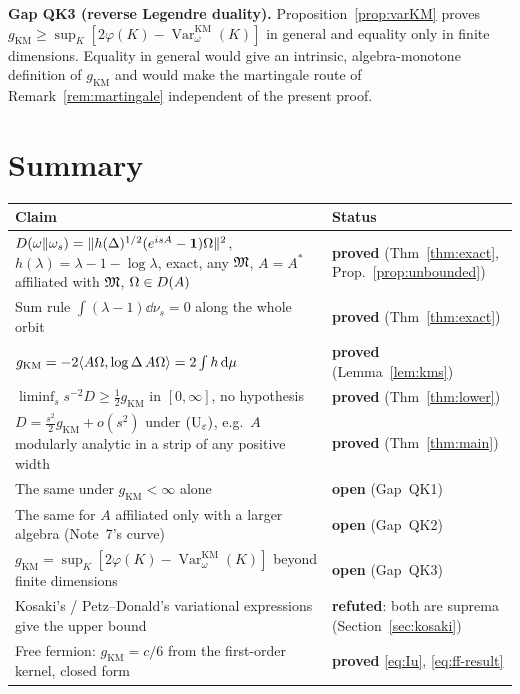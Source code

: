 \documentclass[11pt]{article}
\newcommand{\ip}[2]{\langle#1,#2\rangle}\newcommand{\norm}[1]{\lVert#1\rVert}
\newcommand{\gKM}{g_{\mathrm{KM}}}\newcommand{\gB}{g_{\mathrm B}}
\newcommand{\one}{\mathbf 1}\newcommand{\dist}{\operatorname{dist}}
\begin{document}
\begin{verdictgap}
\textbf{Gap QK3 (reverse Legendre duality).}  Proposition~\ref{prop:varKM} proves
$\gKM\ge\sup_K[2\varphi(K)-\operatorname{Var}^{\mathrm{KM}}_\omega(K)]$ in general and equality only in
finite dimensions.  Equality in general would give an intrinsic, algebra-monotone definition of $\gKM$
and would make the martingale route of Remark~\ref{rem:martingale} independent of the present proof.
\end{verdictgap}

\section{Summary}\label{sec:summary}

\begin{center}\small
\begin{tabular}{@{}p{}p{}@{}}\toprule
\textbf{Claim} & \textbf{Status}\\\midrule
$D(\omega\Vert\omega_s)=\norm{h(\Delta)^{1/2}(e^{isA}-\one)\Om}^2$, $h(\lambda)=\lambda-1-\log\lambda$,
 exact, any $\mathfrak M$, $A=A^*$ affiliated with $\mathfrak M$, $\Omega\in D(A)$
 & \textbf{proved} (Thm~\ref{thm:exact}, Prop.~\ref{prop:unbounded})\\
Sum rule $\int(\lambda-1)\dd\nu_s=0$ along the whole orbit & \textbf{proved} (Thm~\ref{thm:exact})\\
$\gKM=-2\ip{A\Om}{\log\Delta\,A\Om}=2\int h\dd\mu$ & \textbf{proved} (Lemma~\ref{lem:kms})\\
$\liminf_ss^{-2}D\ge\frac12\gKM$ in $[0,\infty]$, no hypothesis & \textbf{proved} (Thm~\ref{thm:lower})\\
$D=\frac{s^2}2\gKM+o(s^2)$ under $(\mathrm U_\varepsilon)$, e.g.\ $A$ modularly analytic in a strip of any
 positive width & \textbf{proved} (Thm~\ref{thm:main})\\
The same under $\gKM<\infty$ alone & \textbf{open} (Gap~QK1)\\
The same for $A$ affiliated only with a larger algebra (Note~7's curve) & \textbf{open} (Gap~QK2)\\
$\gKM=\sup_K[2\varphi(K)-\operatorname{Var}^{\mathrm{KM}}_\omega(K)]$ beyond finite dimensions
 & \textbf{open} (Gap~QK3)\\
Kosaki's / Petz--Donald's variational expressions give the upper bound & \textbf{refuted}: both are
 suprema (Section~\ref{sec:kosaki})\\
Free fermion: $\gKM=c/6$ from the first-order kernel, closed form & \textbf{proved} \eqref{eq:Iu},
 \eqref{eq:ff-result}\\\bottomrule
\end{tabular}
\end{center}
\end{document}
